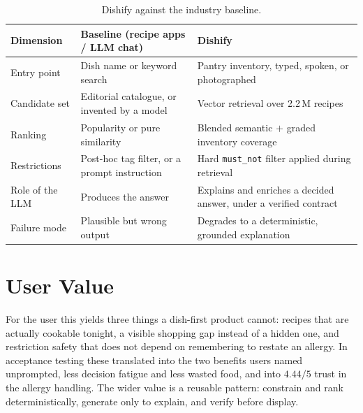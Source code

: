 \begin{table}[!ht]
    \centering
    \caption{Dishify against the industry baseline.}
    \label{tab:novelty}
    \begin{tabularx}{\textwidth}{@{}p{34mm}XX@{}}
        \toprule
        \textbf{Dimension} & \textbf{Baseline (recipe apps / LLM chat)} & \textbf{Dishify} \\
        \midrule
        Entry point      & Dish name or keyword search                & Pantry inventory, typed, spoken, or photographed \\
        Candidate set    & Editorial catalogue, or invented by a model & Vector retrieval over 2.2\,M recipes \\
        Ranking          & Popularity or pure similarity              & Blended semantic $+$ graded inventory coverage \\
        Restrictions     & Post-hoc tag filter, or a prompt instruction & Hard \texttt{must\_not} filter applied during retrieval \\
        Role of the LLM  & Produces the answer                        & Explains and enriches a decided answer, under a verified contract \\
        Failure mode     & Plausible but wrong output                 & Degrades to a deterministic, grounded explanation \\
        \bottomrule
    \end{tabularx}
\end{table}

\section{User Value}

For the user this yields three things a dish-first product cannot: recipes that
are actually cookable tonight, a visible shopping gap instead of a hidden one,
and restriction safety that does not depend on remembering to restate an
allergy. In acceptance testing these translated into the two benefits users
named unprompted, less decision fatigue and less wasted food, and into $4.44/5$
trust in the allergy handling. The wider value is a reusable pattern:
constrain and rank deterministically, generate only to explain, and verify
before display.
